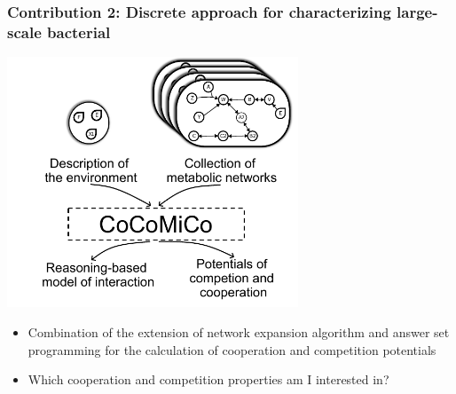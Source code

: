 \documentclass[8pt,usenames,dvipsnames]{beamer}
\begin{document}
\begin{frame}
\frametitle{Contribution 2: Discrete approach for characterizing large-scale bacterial}
\centering
\includegraphics[width=0.65\textwidth]{figures/concept.pdf}
\begin{block}{}
\begin{itemize}
\item Combination of the extension of network expansion algorithm and answer set programming for the calculation of cooperation and competition potentials
\item Which cooperation and competition properties am  I interested in?
\end{itemize}
\end{block}
\end{frame}
\end{document}
